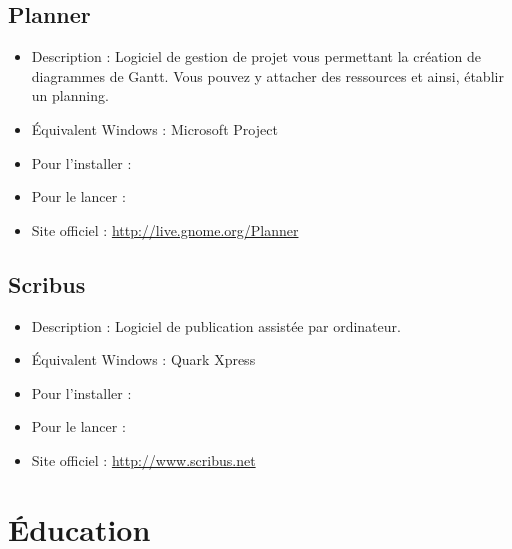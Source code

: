 \subsection{Planner}
\begin{itemize}
\begingroup
{}
\item Description : Logiciel de gestion de projet vous permettant la création de diagrammes de Gantt. Vous pouvez y attacher des ressources et ainsi, établir un planning.{\par}
\item Équivalent Windows : Microsoft Project{\par}
\item Pour l'installer : 
\item Pour le lancer : 
\item Site officiel : \url{http://live.gnome.org/Planner}{\par}
\endgroup
\end{itemize}
\subsection{Scribus}
\begin{itemize}
\begingroup
{}
\item Description : Logiciel de publication assistée par ordinateur.{\par}
\item Équivalent Windows : Quark Xpress{\par}
\item Pour l'installer : 
\item Pour le lancer : 
\item Site officiel : \url{http://www.scribus.net}{\par}
\endgroup
\end{itemize}
\newpage
\section{Éducation}
